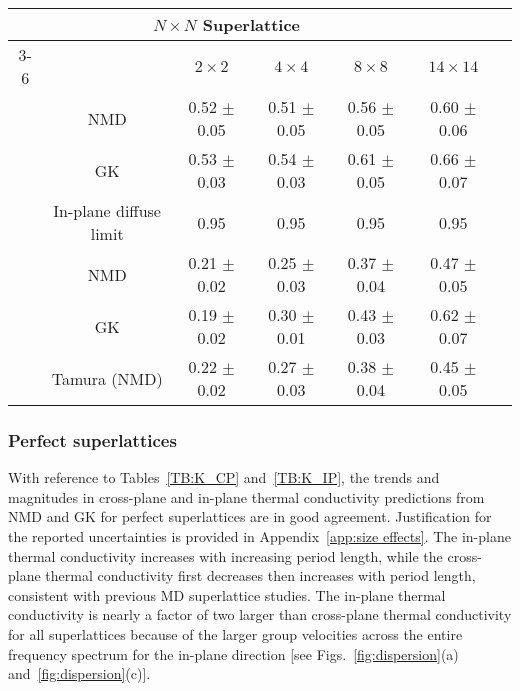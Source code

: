 \documentclass[aps,prb,preprint,preprintnumbers,amsmath,amssymb,floatfix,superscriptaddress]{revtex4}
\begin{document}
\begin{table*}
\begin{center}
\begin{tabular*}{\textwidth}{c@{\extracolsep{\fill}}cccccc}
\hline\hline\noalign{\smallskip}
\multicolumn{2}{c}{\multirow{2}{*}{In-Plane}}&\multicolumn{4}{c}{$N\times N$ Superlattice} \\
\cline{3-6}\noalign{\smallskip}
\hspace{1cm} && $2\times2$ & $4\times4$ & $8\times8$ & $14\times14$  \\
\noalign{\smallskip}\hline\noalign{\smallskip}
\multirow{2}{*}{Perfect} &NMD &0.52 $\pm$ 0.05 & 0.51 $\pm$ 0.05& 0.56 $\pm$ 0.05& 0.60 $\pm$ 0.06\\
&GK &0.53 $\pm$ 0.03 &  0.54 $\pm$ 0.03 &  0.61 $\pm$ 0.05  &  0.66 $\pm$ 0.07 \\
&In-plane diffuse limit & 0.95 & 0.95 & 0.95 & 0.95\\
\noalign{\smallskip}\hline
\multirow{3}{*}{Mixed 80/20} & NMD &0.21 $\pm$ 0.02 & 0.25 $\pm$ 0.03 & 0.37 $\pm$ 0.04 & 0.47  $\pm$ 0.05\\
&GK & 0.19 $\pm$ 0.02 &  0.30 $\pm$ 0.01  & 0.43 $\pm$ 0.03 &  0.62 $\pm$ 0.07 \\   
&Tamura (NMD)& 0.22 $\pm$ 0.02 & 0.27 $\pm$ 0.03 & 0.38 $\pm$ 0.04 & 0.45 $\pm$ 0.05\\
\hline\hline
\end{tabular*}
\end{center}
\renewcommand{\table}{Table.}
\caption{In-plane thermal conductivity predictions [W/m-K].}
\label{TB:K_IP}
\end{table*}
\subsubsection{Perfect superlattices}
With reference to Tables~\ref{TB:K_CP} and~\ref{TB:K_IP}, the trends and magnitudes in cross-plane and in-plane thermal conductivity predictions from NMD and GK for perfect superlattices are in good agreement. Justification for the reported uncertainties is provided in Appendix~\ref{app:size effects}. The in-plane thermal conductivity increases with increasing period length, while the cross-plane thermal conductivity first decreases then increases with period length, consistent with previous MD superlattice studies.\cite {PhysRevB.77.184302,PhysRevB.72.174302} The in-plane thermal conductivity is nearly a factor of two larger than cross-plane thermal conductivity for all superlattices because of the larger group velocities across the entire frequency spectrum for the in-plane direction [see Figs.~\ref{fig:dispersion}(a) and~\ref{fig:dispersion}(c)]. 
\end{document}

